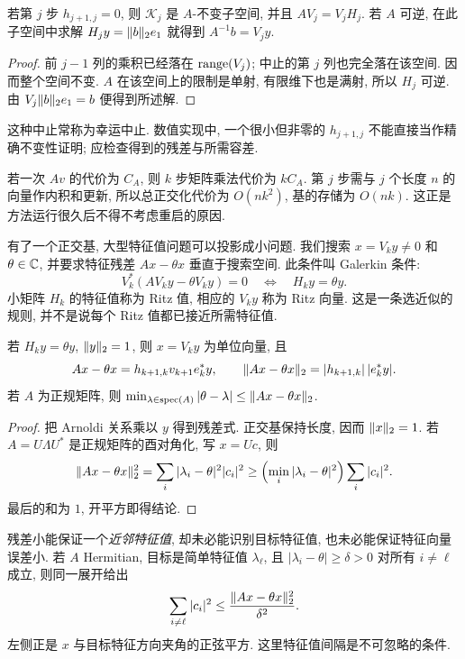 \begin{proposition}[精确中止]\label{prop:arnoldi-breakdown}
若第 $j$ 步 $h_{j+1,j}=0$, 则 $\mathcal K_j$ 是 $A$-不变子空间, 并且 $AV_j=V_jH_j$. 若 $A$ 可逆, 在此子空间中求解 $H_jy=\lVert b\rVert_2e_1$ 就得到 $A^{-1}b=V_jy$.
\end{proposition}
\begin{proof}
前 $j-1$ 列的乘积已经落在 $\operatorname{range}(V_j)$; 中止的第 $j$ 列也完全落在该空间. 因而整个空间不变. $A$ 在该空间上的限制是单射, 有限维下也是满射, 所以 $H_j$ 可逆. 由 $V_j\lVert b\rVert_2e_1=b$ 便得到所述解.
\end{proof}
这种中止常称为幸运中止. 数值实现中, 一个很小但非零的 $h_{j+1,j}$ 不能直接当作精确不变性证明; 应检查得到的残差与所需容差.

若一次 $Av$ 的代价为 $C_A$, 则 $k$ 步矩阵乘法代价为 $kC_A$. 第 $j$ 步需与 $j$ 个长度 $n$ 的向量作内积和更新, 所以总正交化代价为 $O(nk^2)$, 基的存储为 $O(nk)$. 这正是方法运行很久后不得不考虑重启的原因.

有了一个正交基, 大型特征值问题可以投影成小问题. 我们搜索 $x=V_ky\ne0$ 和 $\theta\in\mathbb C$, 并要求特征残差 $Ax-\theta x$ 垂直于搜索空间. 此条件叫 Galerkin 条件:
\[
V_k^*(AV_ky-\theta V_ky)=0
\quad\Longleftrightarrow\quad H_ky=\theta y.
\]
小矩阵 $H_k$ 的特征值称为 Ritz 值, 相应的 $V_ky$ 称为 Ritz 向量. 这是一条选近似的规则, 并不是说每个 Ritz 值都已接近所需特征值.

\begin{proposition}[Ritz 残差]\label{prop:ritz-residual}
若 $H_ky=\theta y$, $\lVert y\rVert_2=1$, 则 $x=V_ky$ 为单位向量, 且
\[
Ax-\theta x=h_{k+1,k}v_{k+1}e_k^*y,
\qquad \lVert Ax-\theta x\rVert_2=|h_{k+1,k}|\,|e_k^*y|.
\]
若 $A$ 为正规矩阵, 则
$\min_{\lambda\in\operatorname{spec}(A)}|\theta-\lambda|\le\lVert Ax-\theta x\rVert_2$.
\end{proposition}
\begin{proof}
把 Arnoldi 关系乘以 $y$ 得到残差式. 正交基保持长度, 因而 $\lVert x\rVert_2=1$. 若 $A=U\Lambda U^*$ 是正规矩阵的酉对角化, 写 $x=Uc$, 则
\[
\lVert Ax-\theta x\rVert_2^2
=\sum_i|\lambda_i-\theta|^2|c_i|^2
\ge\left(\min_i|\lambda_i-\theta|^2\right)\sum_i|c_i|^2.
\]
最后的和为 $1$, 开平方即得结论.
\end{proof}
残差小能保证一个\emph{近邻特征值}, 却未必能识别目标特征值, 也未必能保证特征向量误差小. 若 $A$ Hermitian, 目标是简单特征值 $\lambda_\ell$, 且 $|\lambda_i-\theta|\ge\delta>0$ 对所有 $i\ne\ell$ 成立, 则同一展开给出
\[
\sum_{i\ne\ell}|c_i|^2\le\frac{\lVert Ax-\theta x\rVert_2^2}{\delta^2}.
\]
左侧正是 $x$ 与目标特征方向夹角的正弦平方. 这里特征值间隔是不可忽略的条件.

